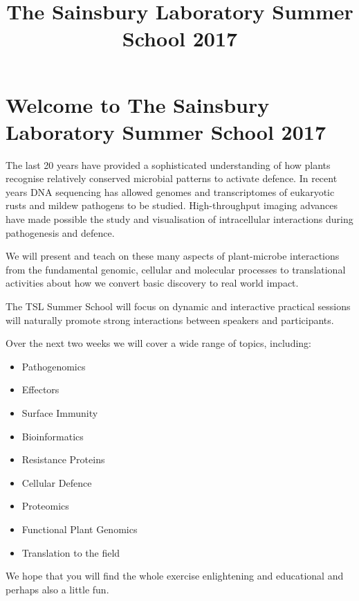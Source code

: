 \documentclass[12pt,]{book}
\title{The Sainsbury Laboratory Summer School 2017}
\author{}
\date{}
\providecommand{\tightlist}{%
  \setlength{\itemsep}{0pt}\setlength{\parskip}{0pt}}
\theoremstyle{definition}
\theoremstyle{definition}
\theoremstyle{remark}
\begin{document}
\maketitle

{
\setcounter{tocdepth}{1}
\tableofcontents
}
\chapter*{Welcome to The Sainsbury Laboratory Summer School
2017}\label{welcome-to-the-sainsbury-laboratory-summer-school-2017}

The last 20 years have provided a sophisticated understanding of how
plants recognise relatively conserved microbial patterns to activate
defence. In recent years DNA sequencing has allowed genomes and
transcriptomes of eukaryotic rusts and mildew pathogens to be studied.
High-throughput imaging advances have made possible the study and
visualisation of intracellular interactions during pathogenesis and
defence.

We will present and teach on these many aspects of plant-microbe
interactions from the fundamental genomic, cellular and molecular
processes to translational activities about how we convert basic
discovery to real world impact.

The TSL Summer School will focus on dynamic and interactive practical
sessions will naturally promote strong interactions between speakers and
participants.

Over the next two weeks we will cover a wide range of topics, including:

\begin{itemize}
\tightlist
\item
  Pathogenomics
\item
  Effectors
\item
  Surface Immunity
\item
  Bioinformatics
\item
  Resistance Proteins
\item
  Cellular Defence
\item
  Proteomics
\item
  Functional Plant Genomics
\item
  Translation to the field
\end{itemize}

We hope that you will find the whole exercise enlightening and
educational and perhaps also a little fun.
\end{document}
